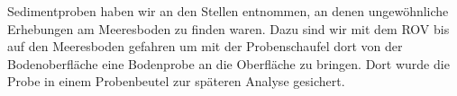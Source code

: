  

Sedimentproben haben wir an den Stellen entnommen, an denen ungewöhnliche Erhebungen am Meeresboden zu finden waren. 
Dazu sind wir mit dem ROV bis auf den Meeresboden gefahren um mit der Probenschaufel dort von der Bodenoberfläche eine Bodenprobe an die Oberfläche zu bringen. Dort wurde die Probe in einem Probenbeutel zur späteren Analyse gesichert.

